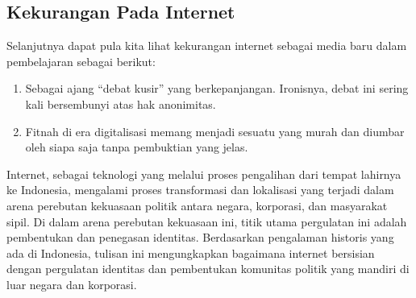\documentclass[12pt, a4paper]{article}
\begin{document}
\subsection{Kekurangan Pada Internet}
    Selanjutnya dapat pula kita lihat kekurangan internet sebagai media baru dalam pembelajaran  sebagai berikut:
\begin{enumerate}
\item Sebagai ajang “debat kusir” yang berkepanjangan. Ironisnya, debat ini sering kali bersembunyi atas hak anonimitas.
\item Fitnah di era digitalisasi memang menjadi sesuatu yang murah dan diumbar oleh siapa saja tanpa pembuktian yang jelas.
\end{enumerate}
Internet, sebagai teknologi yang melalui proses pengalihan dari tempat lahirnya ke Indonesia, mengalami proses transformasi dan lokalisasi yang terjadi dalam arena perebutan kekuasaan politik antara negara, korporasi, dan masyarakat sipil. Di dalam arena perebutan kekuasaan ini, titik utama pergulatan ini adalah pembentukan dan penegasan identitas. Berdasarkan pengalaman historis yang ada di Indonesia, tulisan ini mengungkapkan bagaimana internet bersisian dengan pergulatan identitas dan pembentukan komunitas politik yang mandiri di luar negara dan korporasi.
\end{document}
